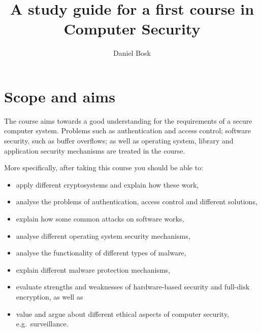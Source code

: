 \title{%
  A study guide for a first course in\\
  Computer Security
}
\author{%
  Daniel Bosk
}

\maketitle


\section{Scope and aims}%
\label{sec:aim}
The course aims towards a good understanding for the requirements of a secure 
computer system.
Problems such as authentication and access control; software security, such as 
buffer overflows; as well as operating system, library and application security 
mechanisms are treated in the course.

More specifically, after taking this course you should be able to:
\begin{itemize}
  \item apply different cryptosystems and explain how these work,
  \item analyse the problems of authentication, access control and different 
  solutions,
  \item explain how some common attacks on software works,
  \item analyse different operating system security mechanisms,
  \item analyse the functionality of different types of malware,
  \item explain different malware protection mechanisms,
  \item evaluate strengths and weaknesses of hardware-based security and 
    full-disk encryption, as well as
  \item value and argue about different ethical aspects of computer security, 
    e.g.\ surveillance.
\end{itemize}



